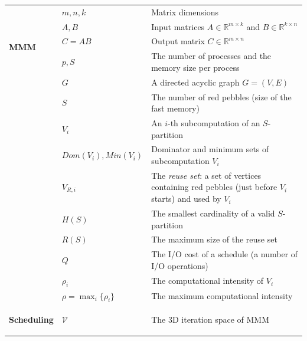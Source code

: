 \documentclass[sigplan,review,anonymous,10pt]{acmart}\settopmatter{printfolios=true,printccs=false,printacmref=false}
\begin{document}
\begin{table}[h]
\vspace{-0.5em}
\setlength{\tabcolsep}{2pt}
\renewcommand{\arraystretch}{0.7}
%
	\centering
	\scriptsize
	\sf
	\begin{tabular}{@{}l|ll@{}}
		\toprule
		\multirow{5}{*}{\begin{turn}{90}\textbf{MMM}\end{turn}}
		& $m, n, k$& Matrix dimensions \\
		& $A, B$& Input matrices $A \in \mathbb{R}^{m \times k}$ and $ B \in 
		\mathbb{R}^{k \times n}$ \\
		& $C = AB$& Output matrix $C \in \mathbb{R}^{m \times n}$ \\
		& $p,S$& The number of processes and the memory size per process \\
		\midrule
		\multirow{13}{*}{\begin{turn}{90}\textbf{I/O complexity}\end{turn}}
		& $G$&A directed acyclic graph $G=(V,E)$\\
		& $S$ & The number of red pebbles (size of the fast memory)\\
		& $V_i$ & An $i$-th subcomputation of an $S$-partition \\
		& $Dom(V_i), Min(V_i)$ & Dominator and minimum sets of subcomputation 
		$V_i$\\
		& $V_{R,i}$ & \makecell[l]{The \emph{reuse set}: a set of vertices 
		containing red pebbles\\(just before $V_i$ starts) and used by $V_i$} \\
		& $H(S)$ & The smallest cardinality of a valid $S$-partition \\
		& $R(S)$ & The maximum size of the reuse set \\
		& $Q$ & The I/O cost of a schedule (a number of I/O operations) \\
		& $\rho_i$ & The computational intensity of $V_i$\\
		& $\rho = \max_i\{\rho_i\}$ & The maximum computational intensity\\
		\midrule
		\multirow{10}{*}{\begin{turn}{90}
				\textbf{Scheduling}
			\end{turn}} 
		& $\mathcal{V}$ & The 3D iteration space of MMM 

\end{tabular}
\end{table}
\end{document}
